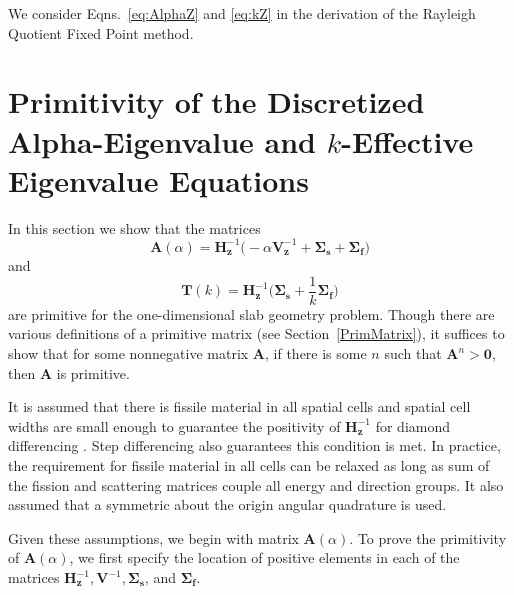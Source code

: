 We consider Eqns.~\ref{eq:AlphaZ} and \ref{eq:kZ} in the derivation of the Rayleigh Quotient Fixed Point method.


%

\section{Primitivity of the Discretized Alpha-Eigenvalue and $k$-Effective Eigenvalue Equations}
\label{sec:PrimPos}

In this section we show that the matrices 
\begin{equation}
\mathbf{A}(\alpha) = \mathbf{H}_{\mathbf{z}}^{-1} \big (-\alpha \mathbf{V}_{\mathbf{z}}^{-1} + \mathbf{\Sigma_{s}} + \mathbf{\Sigma_{f}} \big)
\end{equation}
and
\begin{equation}
\mathbf{T}(k) = \mathbf{H}_{\mathbf{z}}^{-1} \bigg (\mathbf{\Sigma_{s}} + \frac{1}{k}\mathbf{\Sigma_{f}} \bigg)
\end{equation}
are primitive for the one-dimensional slab geometry problem. Though there are various definitions of a primitive matrix (see Section~\ref{PrimMatrix}), it suffices to show that for some nonnegative matrix $\mathbf{A}$, if there is some $n$ such that $\mathbf{A}^{n} > \mathbf{0}$, then $\mathbf{A}$ is primitive.

It is assumed that there is fissile material in all spatial cells and spatial cell widths are small enough to guarantee the positivity of $\mathbf{H}_{\mathbf{z}}^{-1}$ for diamond differencing \cite{greenbaum1997iterative}. Step differencing also guarantees this condition is met. In practice, the requirement for fissile material in all cells can be relaxed as long as sum of the fission and scattering matrices couple all energy and direction groups. It also assumed that a symmetric about the origin angular quadrature is used.

Given these assumptions, we begin with matrix $\mathbf{A}(\alpha)$. To prove the primitivity of $\mathbf{A}(\alpha)$, we first specify the location of positive elements in each of the matrices $\mathbf{H}_{\mathbf{z}}^{-1}, \mathbf{V}^{-1}, \mathbf{\Sigma_{s}}$, and $\mathbf{\Sigma_{f}}$.

